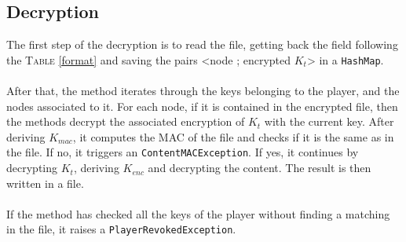 \documentclass[a4paper,titlepage]{article}
\begin{document}
	\subsection{Decryption}
The first step of the decryption is to read the file, getting back the field following the \textsc{Table} \ref{format} and saving the pairs <node ; encrypted $K_t$> in a \texttt{HashMap}. 

\paragraph{}

After that, the method iterates through the keys belonging to the player, and the nodes associated to it. For each node, if it is contained in the encrypted file, then the methods decrypt the associated encryption of $K_t$ with the current key. After deriving $K_{mac}$, it computes the MAC of the file and checks if it is the same as in the file. If no, it triggers an \texttt{ContentMACException}. If yes, it continues by decrypting $K_t$, deriving $K_{enc}$ and decrypting the content. The result is then written in a file.

\paragraph{}

If the method has checked all the keys of the player without finding a matching in the file, it raises a \texttt{PlayerRevokedException}.
\end{document}
